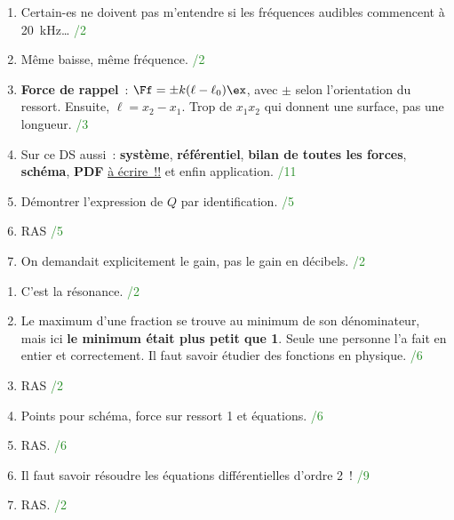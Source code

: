 \documentclass[a4paper, 10pt, final, garamond]{book}
\begin{document}
\begin{minipage}{0.48\linewidth}
    \begin{enumerate}
        \item Certain-es ne doivent pas m'entendre si les fréquences audibles
            commencent à \SI{20}{kHz}… \hfill \textcolor{ForestGreen}{/2}
        \item Même baisse, même fréquence. \hfill \textcolor{ForestGreen}{/2}
        \item \textbf{Force de rappel}~: $\Ff = \pm k(\ell -\ell_0)\ex$, avec $\pm$
            selon l'orientation du ressort. Ensuite, $\ell = x_2 - x_1$. Trop de
            $x_1x_2$ qui donnent une surface, pas une longueur. \hfill
            \textcolor{ForestGreen}{/3}
        \item Sur ce DS aussi~: \textbf{système}, \textbf{référentiel},
            \textbf{bilan de toutes les forces}, \textbf{schéma}, \textbf{PDF}
            \underline{à écrire~!!} et enfin application. \hfill
            \textcolor{ForestGreen}{/11}
        \item Démontrer l'expression de $Q$ par identification. \hfill
            \textcolor{ForestGreen}{/5}
        \item RAS \hfill \textcolor{ForestGreen}{/5}
        \item On demandait explicitement le gain, pas le gain en décibels. \hfill
            \textcolor{ForestGreen}{/2}
    \end{enumerate}
\end{minipage}
\hfill
\begin{minipage}{0.48\linewidth}
    \begin{enumerate}[start=8]
        \item C'est la résonance. \hfill \textcolor{ForestGreen}{/2}
        \item Le maximum d'une fraction se trouve au minimum de son dénominateur,
            mais ici \textbf{le minimum était plus petit que 1}. Seule une personne
            l'a fait en entier et correctement. Il faut savoir étudier des fonctions
            en physique. \hfill \textcolor{ForestGreen}{/6}
        \item RAS \hfill \textcolor{ForestGreen}{/2}
        \item Points pour schéma, force sur ressort 1 et équations. \hfill
            \textcolor{ForestGreen}{/6}
        \item RAS. \hfill \textcolor{ForestGreen}{/6}
        \item Il faut savoir résoudre les équations différentielles d'ordre 2~!
            \hfill \textcolor{ForestGreen}{/9}
        \item RAS. \hfill \textcolor{ForestGreen}{/2}
    \end{enumerate}
\end{minipage}
\end{document}
